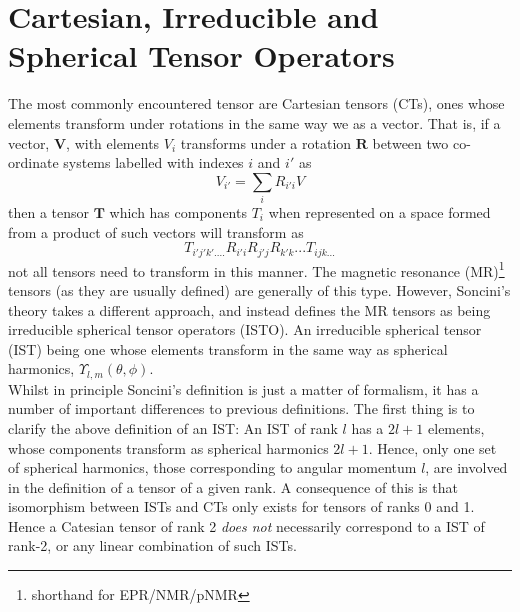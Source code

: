 \documentclass[12pt]{article}
\begin{document}
\section{Cartesian, Irreducible and Spherical Tensor Operators} The most
commonly encountered tensor are Cartesian tensors (CTs), ones whose elements
transform under rotations in the same way we as a vector. That is, if a vector,
$\mathbf{V}$, with elements $V_{i}$ transforms under a rotation $\mathbf{R}$
between two co-ordinate systems labelled with indexes $i$  and $i'$ as
\begin{equation}
V_{i'} = \sum_{i}R_{i'i}V
\end{equation}
then a tensor $\mathbf{T}$ which has components $T_{i}$ when represented on a
space formed from a product of such vectors will transform as
\begin{equation}
T_{i'j'k'....}R_{i'i}R_{j'j}R_{k'k}...T_{ijk...}
\end{equation}
not all tensors need to transform in this manner. The magnetic resonance
(MR)\footnote{shorthand for EPR/NMR/pNMR} tensors (as they are usually defined)
are generally of this type. However, Soncini's theory takes a different
approach, and instead defines the MR tensors as being irreducible spherical
tensor operators (ISTO).  An irreducible spherical tensor (IST) being one whose
elements transform in the same way as spherical harmonics,
$\Upsilon_{l,m}(\theta,\phi)$.\\

\noindent Whilst in principle Soncini's definition is just a matter of
formalism, it has a number of important differences to previous definitions.
The first thing is to clarify the above definition of an IST: An IST of rank
$l$ has a $2l+1$ elements, whose components transform as spherical harmonics
$2l+1$. Hence, only one set of spherical harmonics, those corresponding to
angular momentum $l$, are involved in the definition of a tensor of a given
rank. A consequence of this is that isomorphism between ISTs and CTs only
exists for tensors of ranks 0 and 1. Hence a Catesian tensor of rank 2
\emph{does not} necessarily correspond to a IST of rank-2, or any linear
combination of such ISTs.\\
\end{document}
